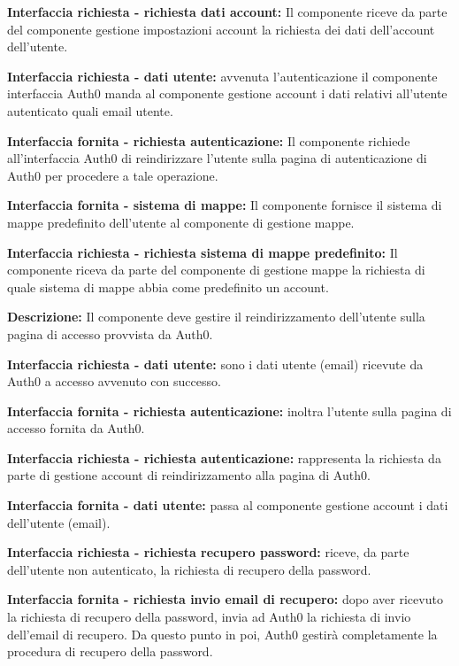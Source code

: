 \begin{listaPersonale}[]{}
    \textbf{Interfaccia richiesta - richiesta dati account:} Il componente riceve da parte del componente gestione impostazioni account la richiesta dei dati dell'account dell'utente.

    \textbf{Interfaccia richiesta - dati utente:} avvenuta l'autenticazione il componente interfaccia Auth0 manda al componente gestione account i dati relativi all'utente autenticato quali email utente.

    \textbf{Interfaccia fornita - richiesta autenticazione:} Il componente richiede all'interfaccia Auth0 di reindirizzare l'utente sulla pagina di autenticazione di Auth0 per procedere a tale operazione.

    \textbf{Interfaccia fornita - sistema di mappe:} Il componente fornisce il sistema di mappe predefinito dell'utente al componente di gestione mappe.

    \textbf{Interfaccia richiesta - richiesta sistema di mappe predefinito:} Il componente riceva da parte del componente di gestione mappe la richiesta di quale sistema di mappe abbia come predefinito un account.



    \textbf{Descrizione:} Il componente deve gestire il reindirizzamento dell'utente sulla pagina di accesso provvista da Auth0. 

    \textbf{Interfaccia richiesta - dati utente:} sono i dati utente (email) ricevute da Auth0 a accesso avvenuto con successo.

    \textbf{Interfaccia fornita - richiesta autenticazione:} inoltra l'utente sulla pagina di accesso fornita da Auth0.

    \textbf{Interfaccia richiesta - richiesta autenticazione:} rappresenta la richiesta da parte di gestione account di reindirizzamento alla pagina di Auth0.

    \textbf{Interfaccia fornita - dati utente:} passa al componente gestione account i dati dell'utente (email).

    \textbf{Interfaccia richiesta - richiesta recupero password:} riceve, da parte dell'utente non autenticato, la richiesta di recupero della password.

    \textbf{Interfaccia fornita - richiesta invio email di recupero:} dopo aver ricevuto la richiesta di recupero della password, invia ad Auth0 la richiesta di invio dell'email di recupero. Da questo punto in poi, Auth0 gestirà completamente la procedura di recupero della password.



\end{listaPersonale}
